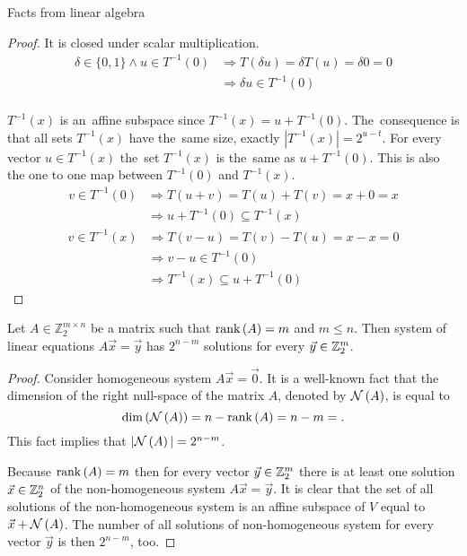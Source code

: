 \begin{chapter}{Facts from linear algebra}
\begin{proof}
It is closed under scalar multiplication.
\[
\begin{split}
\delta \in \{0, 1\} \wedge u \in T^{-1}(0) 
	& \Rightarrow T(\delta u) = \delta T(u) = \delta 0 = 0 \\
	& \Rightarrow \delta u \in T^{-1}(0) \\
\end{split}
\]

$T^{-1}(x)$ is an~affine subspace since $T^{-1}(x) = u + T^{-1}(0)$. The~consequence is that all sets $T^{-1}(x)$ have the~same size, exactly $|T^{-1}(x)| = 2^{u-t}$. For every vector $u \in T^{-1}(x)$ the~set $T^{-1}(x)$ is the~same as $u + T^{-1}(0)$. This is also the one to one map between $T^{-1}(0)$ and $T^{-1}(x)$.
\begin{displaymath}
\begin{split}
v \in T^{-1}(0) 
	& \Rightarrow T(u+v) = T(u) + T(v) = x + 0 = x  \\
	& \Rightarrow u + T^{-1}(0) \subseteq T^{-1}(x)
\end{split}
\end{displaymath}
\begin{displaymath}
\begin{split}
v \in T^{-1}(x) 
	& \Rightarrow T(v-u) = T(v) - T(u) = x - x = 0 \\
	& \Rightarrow v - u \in T^{-1}(0) \\
	& \Rightarrow T^{-1}(x) \subseteq u + T^{-1}(0)
\end{split}
\end{displaymath}
\end{proof}

\begin{lemma}
\label{lemma-system-of-linear-equations-solution-count}
Let $A \in \mathbb{Z}_2^{m \times n}$ be a matrix such that $\mathrm{rank}\left({A}\right) = m$ and $m \leq n$. Then system of linear equations $A\vec{x} = \vec{y}$ has $2 ^ {n - m}$ solutions for every $\vec{y} \in \mathbb{Z}_{2}^{m}$.
\end{lemma}
\begin{proof}
Consider homogeneous system $A\vec{x} = \vec{0}$. It is a well-known fact that the dimension of the right null-space of the matrix $A$, denoted by $\mathcal{N}\left({A}\right)$, is equal to \[ \mathrm{dim}\left({\mathcal{N}\left({A}\right)}\right) =n - \mathrm{rank}\left({A}\right) = n - m = \text{.} \] This fact implies that $|\mathcal{N}\left({A}\right)| = 2 ^ {n - m}$.

Because $\mathrm{rank}\left({A}\right) = m$ then for every vector $\vec{y} \in \mathbb{Z}_{2}^{m}$ there is at least one solution $\vec{x} \in \mathbb{Z}_{2}^{n}$ of the non-homogeneous system $A\vec{x} = \vec{y}$. It is clear that the set of all solutions of the non-homogeneous system is an affine subspace of $V$ equal to $\vec{x} + \mathcal{N}\left({A}\right)$. The number of all solutions of non-homogeneous system for every vector $\vec{y}$ is then $2 ^ {n - m}$, too.
\end{proof}
\end{chapter}
